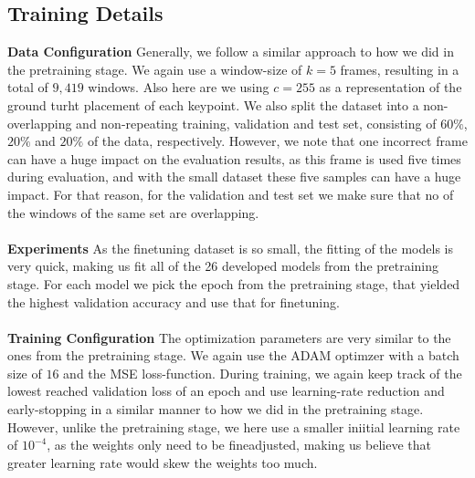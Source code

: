 \documentclass[./main.tex]{subfiles}
\begin{document}
\subsection{Training Details}
\textbf{Data Configuration} Generally, we follow a similar approach to how we did in the pretraining stage. We again use a window-size of $k = 5$ frames, resulting in a total of $9,419$ windows. Also here are we using $c = 255$ as a representation of the ground turht placement of each keypoint. We also split the dataset into a non-overlapping and non-repeating training, validation and test set, consisting of $60\%$, $20\%$ and $20\%$ of the data, respectively. However, we note that one incorrect frame can have a huge impact on the evaluation results, as this frame is used five times during evaluation, and with the small dataset these five samples can have a huge impact. For that reason, for the validation and test set we make sure that no of the windows of the same set are overlapping.
\\
\\
\textbf{Experiments} As the finetuning dataset is so small, the fitting of the models is very quick, making us fit all of the 26 developed models from the pretraining stage. For each model we pick the epoch from the pretraining stage, that yielded the highest validation accuracy and use that for finetuning.
\\
\\
\textbf{Training Configuration} The optimization parameters are very similar to the ones from the pretraining stage. We again use the ADAM optimzer with a batch size of $16$ and the MSE loss-function. During training, we again keep track of the lowest reached validation loss of an epoch and use learning-rate reduction and early-stopping in a similar manner to how we did in the pretraining stage. However, unlike the pretraining stage, we here use a smaller iniitial learning rate of $10^{-4}$, as the weights only need to be fineadjusted, making us believe that greater learning rate would skew the weights too much.
\end{document}
